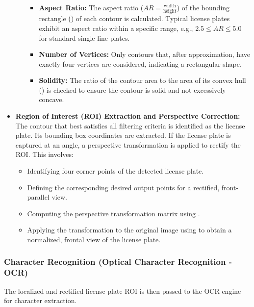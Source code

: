 \begin{itemize}
\begin{itemize}
\begin{itemize}
            \item \textbf{Aspect Ratio:} The aspect ratio ($AR = \frac{\text{width}}{\text{height}}$) of the bounding rectangle () of each contour is calculated. Typical license plates exhibit an aspect ratio within a specific range, e.g., $2.5 \le AR \le 5.0$ for standard single-line plates.
            \item \textbf{Number of Vertices:} Only contours that, after approximation, have exactly four vertices are considered, indicating a rectangular shape.
            \item \textbf{Solidity:} The ratio of the contour area to the area of its convex hull () is checked to ensure the contour is solid and not excessively concave.
        \end{itemize}
    \end{itemize}
    \item \textbf{Region of Interest (ROI) Extraction and Perspective Correction:} The contour that best satisfies all filtering criteria is identified as the license plate. Its bounding box coordinates are extracted. If the license plate is captured at an angle, a perspective transformation is applied to rectify the ROI. This involves:
    \begin{itemize}
        \item Identifying four corner points of the detected license plate.
        \item Defining the corresponding desired output points for a rectified, front-parallel view.
        \item Computing the perspective transformation matrix using .
        \item Applying the transformation to the original image using  to obtain a normalized, frontal view of the license plate.
    \end{itemize}
\end{itemize}

\subsubsection{Character Recognition (Optical Character Recognition - OCR)}
\label{subsubsec:ocr}

The localized and rectified license plate ROI is then passed to the OCR engine for character extraction.

